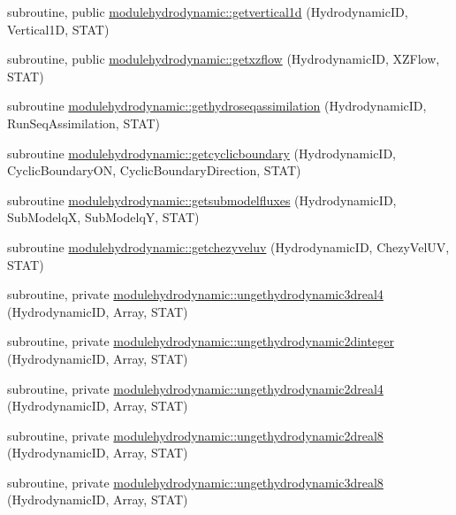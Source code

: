 \begin{DoxyCompactItemize}
\item 
subroutine, public \mbox{\hyperlink{namespacemodulehydrodynamic_a384df1b51bd6ad1c528b5658c4414bae}{modulehydrodynamic\+::getvertical1d}} (Hydrodynamic\+ID, Vertical1D, S\+T\+AT)
\item 
subroutine, public \mbox{\hyperlink{namespacemodulehydrodynamic_af349d31454a6c7a674ed8d54430b0e52}{modulehydrodynamic\+::getxzflow}} (Hydrodynamic\+ID, X\+Z\+Flow, S\+T\+AT)
\item 
subroutine \mbox{\hyperlink{namespacemodulehydrodynamic_ab2980a48cd10c0f2def3784cbf27608c}{modulehydrodynamic\+::gethydroseqassimilation}} (Hydrodynamic\+ID, Run\+Seq\+Assimilation, S\+T\+AT)
\item 
subroutine \mbox{\hyperlink{namespacemodulehydrodynamic_a073f4ba07360a6b7522733db2651b41d}{modulehydrodynamic\+::getcyclicboundary}} (Hydrodynamic\+ID, Cyclic\+Boundary\+ON, Cyclic\+Boundary\+Direction, S\+T\+AT)
\item 
subroutine \mbox{\hyperlink{namespacemodulehydrodynamic_a2b0f8d10e1768612e8bc67bcc2535ffe}{modulehydrodynamic\+::getsubmodelfluxes}} (Hydrodynamic\+ID, Sub\+ModelqX, Sub\+ModelqY, S\+T\+AT)
\item 
subroutine \mbox{\hyperlink{namespacemodulehydrodynamic_a95c4b43f87d68ca27ecae9520c33f91f}{modulehydrodynamic\+::getchezyveluv}} (Hydrodynamic\+ID, Chezy\+Vel\+UV, S\+T\+AT)
\item 
subroutine, private \mbox{\hyperlink{namespacemodulehydrodynamic_a624a2d0694d918e1923e5b6464802fce}{modulehydrodynamic\+::ungethydrodynamic3dreal4}} (Hydrodynamic\+ID, Array, S\+T\+AT)
\item 
subroutine, private \mbox{\hyperlink{namespacemodulehydrodynamic_a850463758a40d651e2c1a5de7adb45cc}{modulehydrodynamic\+::ungethydrodynamic2dinteger}} (Hydrodynamic\+ID, Array, S\+T\+AT)
\item 
subroutine, private \mbox{\hyperlink{namespacemodulehydrodynamic_a7c4ba25ca6d8985ff9fc7b27aebbf48e}{modulehydrodynamic\+::ungethydrodynamic2dreal4}} (Hydrodynamic\+ID, Array, S\+T\+AT)
\item 
subroutine, private \mbox{\hyperlink{namespacemodulehydrodynamic_a38b09b823496f823b15a0b020595a9c1}{modulehydrodynamic\+::ungethydrodynamic2dreal8}} (Hydrodynamic\+ID, Array, S\+T\+AT)
\item 
subroutine, private \mbox{\hyperlink{namespacemodulehydrodynamic_afc2a72c29bd11cd7048168f6275a3938}{modulehydrodynamic\+::ungethydrodynamic3dreal8}} (Hydrodynamic\+ID, Array, S\+T\+AT)
\item 

\end{DoxyCompactItemize}
